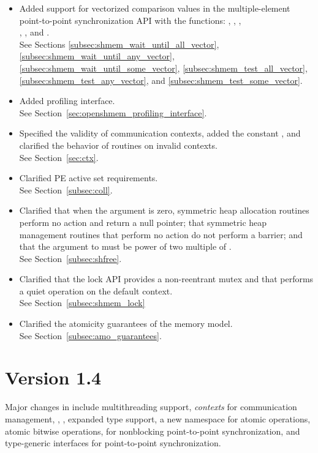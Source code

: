 \begin{itemize}
%
\item Added support for vectorized comparison values in the multiple-element
  point-to-point synchronization API with the functions:
  , ,
  , \\
  , , and
  .
  \\See Sections \ref{subsec:shmem_wait_until_all_vector},
  \ref{subsec:shmem_wait_until_any_vector}, \ref{subsec:shmem_wait_until_some_vector},
  \ref{subsec:shmem_test_all_vector}, \ref{subsec:shmem_test_any_vector}, and
  \ref{subsec:shmem_test_some_vector}.
%
\item Added \openshmem profiling interface.
  \\ See Section~\ref{sec:openshmem_profiling_interface}.
%
\item Specified the validity of communication contexts, added the constant
  , and clarified the behavior of
   routines on invalid contexts.
  \\ See Section~\ref{sec:ctx}.
%
\item Clarified \ac{PE} active set requirements.
    \\See Section~\ref{subsec:coll}.
%
\item Clarified that when the  argument is zero, symmetric heap
    allocation routines perform no action and return a null pointer; that
    symmetric heap management routines that perform no action do not perform a
    barrier; and that the  argument to  must
    be power of two multiple of .
    \\See Section~\ref{subsec:shfree}.
%
\item Clarified that the \openshmem lock API provides a non-reentrant mutex and
    that  performs a quiet operation on the default
    context.
    \\See Section~\ref{subsec:shmem_lock}
%
\item Clarified the atomicity guarantees of the \openshmem memory model.
    \\See Section~\ref{subsec:amo_guarantees}.
%
\end{itemize}

\section{Version 1.4}
Major changes in \openshmem[1.4] include
multithreading support,
\emph{contexts} for communication management,
,
,
expanded type support,
a new namespace for atomic operations,
atomic bitwise operations,
 for nonblocking point-to-point synchronization,
and \Cstd[11] type-generic interfaces for point-to-point synchronization.

